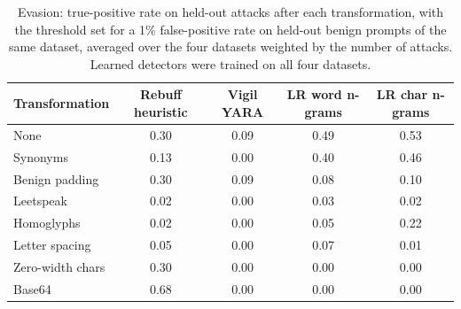\begin{table}[t]
\centering
\caption{Evasion: true-positive rate on held-out attacks after each transformation, with the threshold set for a 1\% false-positive rate on held-out benign prompts of the same dataset, averaged over the four datasets weighted by the number of attacks. Learned detectors were trained on all four datasets.}
\label{tab:ev}
\footnotesize
\setlength{\tabcolsep}{3pt}
\begin{tabular}{lcccc}
\toprule
Transformation & Rebuff heuristic & Vigil YARA & LR word n-grams & LR char n-grams \\
\midrule
None & 0.30 & 0.09 & 0.49 & 0.53 \\
Synonyms & 0.13 & 0.00 & 0.40 & 0.46 \\
Benign padding & 0.30 & 0.09 & 0.08 & 0.10 \\
Leetspeak & 0.02 & 0.00 & 0.03 & 0.02 \\
Homoglyphs & 0.02 & 0.00 & 0.05 & 0.22 \\
Letter spacing & 0.05 & 0.00 & 0.07 & 0.01 \\
Zero-width chars & 0.30 & 0.00 & 0.00 & 0.00 \\
Base64 & 0.68 & 0.00 & 0.00 & 0.00 \\
\bottomrule
\end{tabular}
\end{table}
